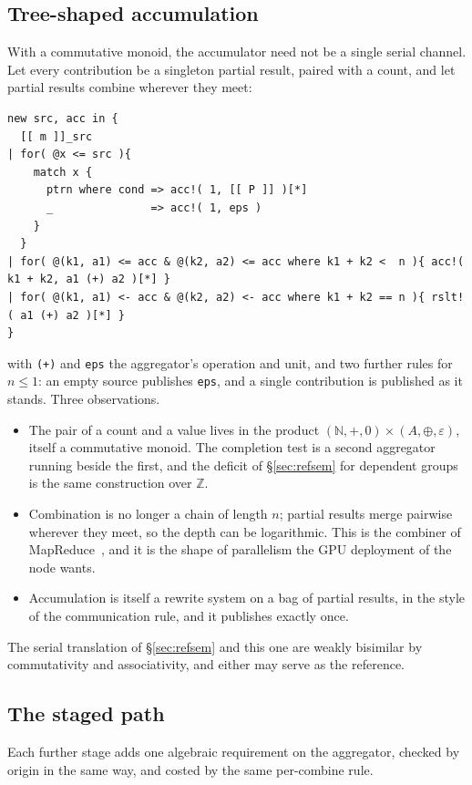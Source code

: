 \documentclass[11pt]{article}
\theoremstyle{definition}
\theoremstyle{plain}
\theoremstyle{remark}
\begin{document}
\subsection{Tree-shaped accumulation}
\label{sec:tree}

With a commutative monoid, the accumulator need not be a single serial
channel. Let every contribution be a singleton partial result, paired with a
count, and let partial results combine wherever they meet:
\begin{lstlisting}
new src, acc in {
  [[ m ]]_src
| for( @x <= src ){
    match x {
      ptrn where cond => acc!( 1, [[ P ]] )[*]
      _               => acc!( 1, eps )
    }
  }
| for( @(k1, a1) <= acc & @(k2, a2) <= acc where k1 + k2 <  n ){ acc!(  k1 + k2, a1 (+) a2 )[*] }
| for( @(k1, a1) <- acc & @(k2, a2) <- acc where k1 + k2 == n ){ rslt!( a1 (+) a2 )[*] }
}
\end{lstlisting}
with \texttt{(+)} and \texttt{eps} the aggregator's operation and unit, and
two further rules for \(n \le 1\): an empty source publishes \texttt{eps}, and a
single contribution is published as it stands. Three observations.
\begin{itemize}[nosep]
\item The pair of a count and a value lives in the product
\((\mathbb{N},+,0)\times(A,\oplus,\varepsilon)\), itself a commutative monoid.
The completion test is a second aggregator running beside the first, and the
deficit of \S\ref{sec:refsem} for dependent groups is the same construction over
\(\mathbb{Z}\).
\item Combination is no longer a chain of length \(n\); partial results merge
pairwise wherever they meet, so the depth can be logarithmic. This is the
combiner of MapReduce~\cite{DeanGhemawat04}, and it is the shape of parallelism
the GPU deployment of the node wants.
\item Accumulation is itself a rewrite system on a bag of partial results, in
the style of the communication rule, and it publishes exactly once.
\end{itemize}
The serial translation of \S\ref{sec:refsem} and this one are weakly bisimilar
by commutativity and associativity, and either may serve as the reference.

\subsection{The staged path}
\label{sec:stages}

Each further stage adds one algebraic requirement on the aggregator, checked by
origin in the same way, and costed by the same per-combine rule.
\end{document}
